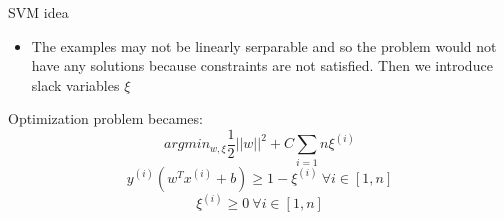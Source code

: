 \begin{frame}{SVM idea}
	\begin{itemize}\setlength\itemsep{1em}
		\item The examples may not be linearly serparable and so the problem would not have any solutions because constraints are not satisfied. Then we introduce slack variables $\xi$
	\end{itemize}
	Optimization problem becames:
	$$arg min_{w, \xi} \frac{1}{2} ||w||^2 + C \sum_{i = 1}{n}\xi^{(i)}$$
	$$y^{(i)} (w^T x^{(i)} + b) \geq 1 - \xi^{(i)} \ \forall i \in [1, n]$$
	$$\xi^{(i)} \geq 0 \ \forall i \in [1, n]$$
\end{frame}